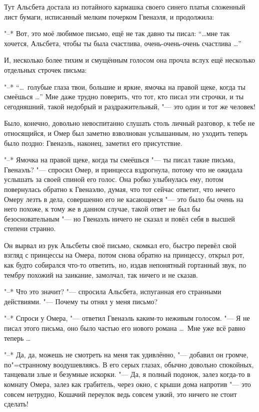 Тут Альсбета достала из потайного кармашка своего синего платья сложенный лист
бумаги, исписанный мелким почерком Гвенаэля, и продолжила:

"--* Вот, это моё любимое письмо, ещё не так давно ты писал:
\enquote{\ldots мне так хочется, Альсбета, чтобы ты была счастлива, очень-очень-очень
счастлива \ldots}

И, несколько более тихим и смущённым голосом она прочла вслух ещё несколько
отдельных строчек письма:

"--* \enquote{\ldots\ голубые глаза твои, большие и яркие, ямочка на правой щеке,
когда ты смеёшься \ldots}
Мне даже трудно поверить, что тот, кто писал эти строчки, и ты сегодняшний,
такой недобрый и раздражительный, "--- это один и тот же человек!

Было, конечно, довольно невоспитанно слушать столь личный разговор, к тебе не
относящийся, и Омер был заметно взволнован услышанным, но уходить теперь было
поздно: Гвенаэль, наконец, заметил его присутствие.

"--* Ямочка на правой щеке, когда ты смеёшься "--- ты писал такие письма,
Гвенаэль? "--- спросил Омер, и принцесса вздрогнула, потому что не ожидала
услышать за своей спиной его голос.
Она робко улыбнулась ему, потом повернулась обратно к Гвенаэлю, думая, что тот
сейчас ответит, что нечего Омеру лезть в дела, совершенно его не касающиеся "---
это было бы очень на него похоже, к тому же в данном случае, такой ответ не был
бы безосновательным "--- но Гвенаэль ничего не сказал и повёл себя в высшей
степени странно.

Он вырвал из рук Альсбеты своё письмо, скомкал его, быстро перевёл свой взгляд с
принцессы на Омера, потом снова обратно на принцессу, открыл рот, как будто
собирался что-то ответить, но, издав непонятный гортанный звук, по тембру
похожий на заикание, замолчал, так ничего и не сказав.

"--* Что это значит? "--- спросила Альсбета, испуганная его странными
действиями.
"--- Почему ты отнял у меня письмо?

"--* Спроси у Омера, "--- ответил Гвенаэль каким-то неживым голосом.
"--- Я не писал этого письма, оно было частью его нового романа \ldots\
Мне уже всё равно теперь \ldots

"--* Да, да, можешь не смотреть на меня так удивлённо, "--- добавил он громче,
по"=странному воодушевляясь.
В его серых глазах, обычно довольно спокойных, танцевали злые и безумные
искорки.
"--- Да, я полный подонок, залез когда-то в комнату Омера, залез как грабитель,
через окно, с крыши дома напротив "--- это совсем нетрудно, Кошачий переулок
ведь совсем узкий, это ничего не стоит сделать!

